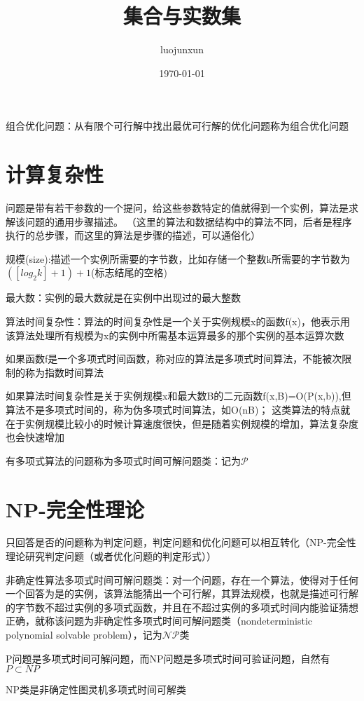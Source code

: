\documentclass[12pt, a4paper, oneside]{ctexart}
\title{\huge\textbf{集合与实数集}}
\author{luojunxun}
\date{\today}
\begin{document}
\maketitle

组合优化问题：从有限个可行解中找出最优可行解的优化问题称为组合优化问题

\section*{计算复杂性}
问题是带有若干参数的一个提问，给这些参数特定的值就得到一个实例，算法是求解该问题的通用步骤描述。
（这里的算法和数据结构中的算法不同，后者是程序执行的总步骤，而这里的算法是步骤的描述，可以通俗化）

规模(size):描述一个实例所需要的字节数，比如存储一个整数k所需要的字节数为$([log_2k]+1)+1$(标志结尾的空格)

最大数：实例的最大数就是在实例中出现过的最大整数

算法时间复杂性：算法的时间复杂性是一个关于实例规模x的函数f(x)，他表示用该算法处理所有规模为x的实例中所需基本运算最多的那个实例的基本运算次数

如果函数f是一个多项式时间函数，称对应的算法是多项式时间算法，不能被次限制的称为指数时间算法

如果算法时间复杂性是关于实例规模x和最大数B的二元函数f(x,B)=O(P(x,b)),但算法不是多项式时间的，称为伪多项式时间算法，如O(nB)；
这类算法的特点就在于实例规模比较小的时候计算速度很快，但是随着实例规模的增加，算法复杂度也会快速增加

有多项式算法的问题称为多项式时间可解问题类：记为$\mathcal{P}$

\section*{NP-完全性理论}

只回答是否的问题称为判定问题，判定问题和优化问题可以相互转化（NP-完全性理论研究判定问题（或者优化问题的判定形式））

非确定性算法多项式时间可解问题类：对一个问题，存在一个算法，使得对于任何一个回答为是的实例，该算法能猜出一个可行解，其算法规模，也就是描述可行解的字节数不超过实例的多项式函数，并且在不超过实例的多项式时间内能验证猜想正确，就称该问题为非确定性多项式时间可解问题类（nondeterministic polynomial solvable problem），记为$\mathcal{NP}$类

P问题是多项式时间可解问题，而NP问题是多项式时间可验证问题，自然有$P\subset NP$

NP类是非确定性图灵机多项式时间可解类
\end{document}
